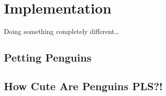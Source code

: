 \setchaptertoc
\chapter{Implementation}\label{chp:implementation}

\begin{summary}
Doing something completely different\ldots
\end{summary}

\section[Fun]{Petting Penguins}

\section[Happy]{How Cute Are Penguins PLS?!}
